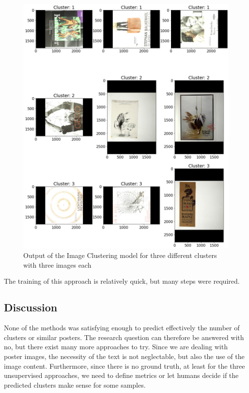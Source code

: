 \documentclass[conference]{IEEEtran}
\begin{document}
\begin{figure}
\centering
\includegraphics[width=1\linewidth]{../Imgs/image_clustering_example}
\caption{Output of the Image Clustering model for three different clusters with three images each}
\label{fig:kmeans_example}
\end{figure}

The training of this approach is relatively quick, but many steps were required. 

\subsection{Discussion}

None of the methods was satisfying enough to predict effectively the number of clusters or similar posters. The research question can therefore be answered with no, but there exist many more approaches to try. Since we are dealing with poster images, the necessity of the text is not neglectable, but also the use of the image content. Furthermore, since there is no ground truth, at least for the three unsupervised approaches, we need to define metrics or let humans decide if the predicted clusters make sense for some samples. 
\end{document}
